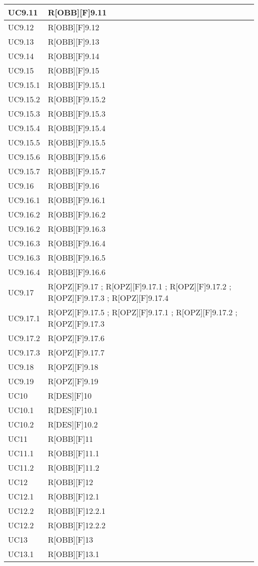 	\begin{table}[H]
		\centering
		\begin{tabular}{|p{}|p{}|}
			\midrule

			UC9.11 & R[OBB][F]9.11 \\ \midrule
			UC9.12 & R[OBB][F]9.12 \\ \midrule
			UC9.13 & R[OBB][F]9.13 \\ \midrule
			UC9.14 & R[OBB][F]9.14 \\ \midrule
			UC9.15 & R[OBB][F]9.15 \\ \midrule
			UC9.15.1 & R[OBB][F]9.15.1 \\ \midrule
			UC9.15.2 & R[OBB][F]9.15.2 \\ \midrule
			UC9.15.3 & R[OBB][F]9.15.3 \\ \midrule
			UC9.15.4 & R[OBB][F]9.15.4 \\ \midrule
			UC9.15.5 & R[OBB][F]9.15.5 \\ \midrule
			UC9.15.6 & R[OBB][F]9.15.6 \\ \midrule
			UC9.15.7 & R[OBB][F]9.15.7 \\ \midrule
			UC9.16 & R[OBB][F]9.16 \\ \midrule
			UC9.16.1 & R[OBB][F]9.16.1 \\ \midrule
			UC9.16.2 & R[OBB][F]9.16.2 \\ \midrule
			UC9.16.2 & R[OBB][F]9.16.3 \\ \midrule
			UC9.16.3 & R[OBB][F]9.16.4 \\ \midrule
			UC9.16.3 & R[OBB][F]9.16.5 \\ \midrule
			UC9.16.4 & R[OBB][F]9.16.6 \\ \midrule
			UC9.17 & R[OPZ][F]9.17 ; R[OPZ][F]9.17.1 ; R[OPZ][F]9.17.2 ; R[OPZ][F]9.17.3 ; R[OPZ][F]9.17.4 \\ \midrule
			UC9.17.1 & R[OPZ][F]9.17.5 ; R[OPZ][F]9.17.1 ; R[OPZ][F]9.17.2 ; R[OPZ][F]9.17.3 \\ \midrule
			UC9.17.2 & R[OPZ][F]9.17.6 \\ \midrule
			UC9.17.3 & R[OPZ][F]9.17.7 \\ \midrule
			UC9.18 & R[OPZ][F]9.18 \\ \midrule
			UC9.19 & R[OPZ][F]9.19 \\ \midrule
			UC10 & R[DES][F]10 \\ \midrule			
			UC10.1 & R[DES][F]10.1 \\ \midrule
			UC10.2 & R[DES][F]10.2 \\ \midrule
			UC11 & R[OBB][F]11 \\ \midrule
			UC11.1 & R[OBB][F]11.1 \\ \midrule
			UC11.2 & R[OBB][F]11.2 \\ \midrule
			UC12 & R[OBB][F]12 \\ \midrule
			UC12.1 & R[OBB][F]12.1 \\ \midrule
			UC12.2 & R[OBB][F]12.2.1 \\ \midrule
			UC12.2 & R[OBB][F]12.2.2 \\ \midrule
			UC13 & R[OBB][F]13 \\ \midrule
			UC13.1 & R[OBB][F]13.1 \\
			

\end{tabular}
\end{table}
